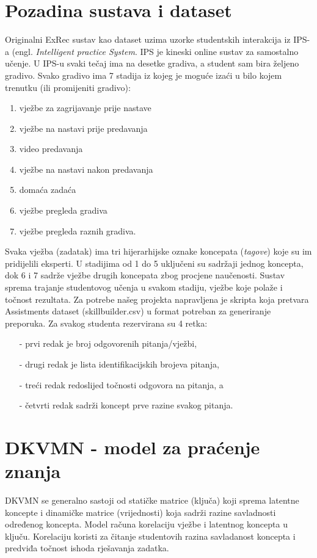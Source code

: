\documentclass[times, utf8,projekt]{fer}
\begin{document}
\section{Pozadina sustava i dataset}
Originalni ExRec sustav kao dataset uzima uzorke studentskih interakcija iz IPS-a (engl. \textit{Intelligent practice System}.
IPS je kineski online sustav za samostalno učenje. U IPS-u svaki tečaj ima na desetke gradiva, a student sam bira željeno gradivo. Svako gradivo ima 7 stadija iz kojeg je moguće izaći u bilo kojem trenutku (ili promijeniti gradivo):
\begin{enumerate}
\item vježbe za zagrijavanje prije nastave
\item vježbe na nastavi prije predavanja
\item video predavanja
\item vježbe na nastavi nakon predavanja
\item domaća zadaća
\item vježbe pregleda gradiva
\item vježbe pregleda raznih gradiva.
\end{enumerate}
Svaka vježba (zadatak) ima tri hijerarhijske oznake koncepata (\textit{tagove}) koje su im pridijelili eksperti. U stadijima od 1 do 5 uključeni su sadržaji jednog koncepta, dok 6 i 7 sadrže vježbe drugih koncepata zbog procjene naučenosti. Sustav sprema trajanje studentovog učenja u svakom stadiju, vježbe koje polaže i točnost rezultata.\newline
\newline
Za potrebe našeg projekta napravljena je skripta koja pretvara Assistments dataset (skillbuilder.csv) u format potreban za generiranje preporuka.\newline
Za svakog studenta rezervirana su 4 retka:
\begin{itemize}
\item[-]prvi redak je broj odgovorenih pitanja/vježbi,
\item[-]drugi redak je lista identifikacijskih brojeva pitanja,
\item[-]treći redak redoslijed točnosti odgovora na pitanja, a
\item[-]četvrti redak sadrži koncept prve razine svakog pitanja.
\end{itemize}
\section{DKVMN - model za praćenje znanja}
DKVMN se generalno sastoji od statičke matrice (ključa) koji sprema latentne koncepte i dinamičke matrice (vrijednosti) koja sadrži razine savladnosti određenog koncepta. Model računa korelaciju vježbe i latentnog koncepta u ključu. Korelaciju koristi za čitanje studentovih razina savladanost koncepta i predviđa točnost ishoda rješavanja zadatka.\newline
\end{document}
